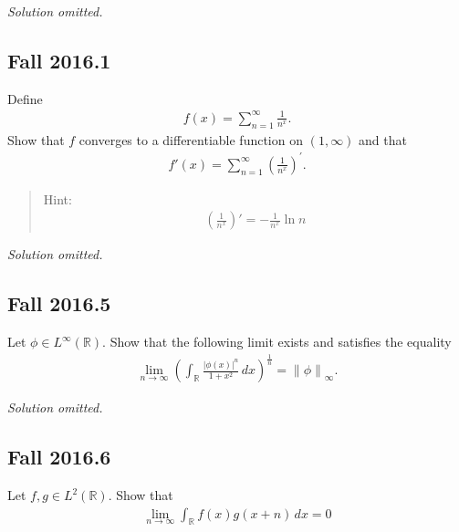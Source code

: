 \emph{Solution omitted.}

\hypertarget{fall-2016.1}{%
\subsection{Fall 2016.1}\label{fall-2016.1}}

Define
\begin{align*}
f(x) = \sum_{n=1}^{\infty} \frac{1}{n^{x}}.
\end{align*}
Show that \(f\) converges to a differentiable function on
\((1, \infty)\) and that
\begin{align*}
f'(x)  =\sum_{n=1}^{\infty}\left(\frac{1}{n^{x}}\right)^{\prime}.
\end{align*}

\begin{quote}
Hint:
\begin{align*}
\left(\frac{1}{n^{x}}\right)' = -\frac{1}{n^{x}} \ln n
\end{align*}
\end{quote}


\emph{Solution omitted.}

\hypertarget{fall-2016.5}{%
\subsection{Fall 2016.5}\label{fall-2016.5}}

Let \(\phi\in L^\infty({\mathbb{R}})\). Show that the following limit
exists and satisfies the equality
\begin{align*}
\lim _{n \to \infty} \left(\int _{\mathbb{R}} \frac{|\phi(x)|^{n}}{1+x^{2}} \, dx \right) ^ {\frac{1}{n}} 
= {\left\lVert {\phi} \right\rVert}_\infty.
\end{align*}

\emph{Solution omitted.}

\hypertarget{fall-2016.6}{%
\subsection{Fall 2016.6}\label{fall-2016.6}}

Let \(f, g \in L^2({\mathbb{R}})\). Show that
\begin{align*}
\lim _{n \to \infty} \int _{{\mathbb{R}}} f(x) g(x+n) \,dx = 0
\end{align*}



